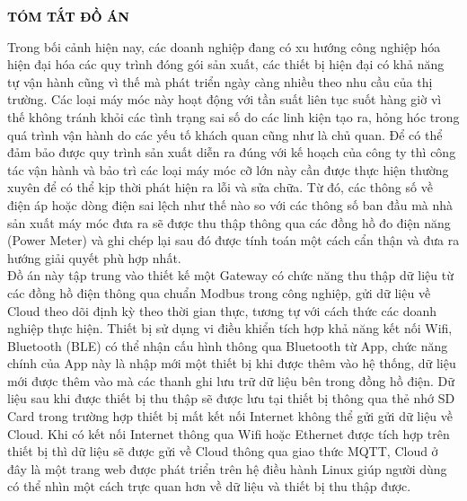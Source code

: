 \begin{center}
	{\fontsize{24pt}{24pt}\selectfont\textbf{\textcolor{black}{TÓM TẮT ĐỒ ÁN}}}
\end{center}

Trong bối cảnh hiện nay, các doanh nghiệp đang có xu hướng công nghiệp hóa hiện 
đại hóa các quy trình đóng gói sản xuất, các thiết bị hiện đại có khả năng tự vận hành cũng 
vì thế mà phát triển ngày càng nhiều theo nhu cầu của thị trường. Các loại máy móc này hoạt 
động với tần suất liên tục suốt hàng giờ vì thế không tránh khỏi các tình trạng sai số do các linh 
kiện tạo ra, hỏng hóc trong quá trình vận hành do các yếu tố khách quan cũng như là chủ 
quan. Để có thể đảm bảo được quy trình sản xuất diễn ra đúng với kế hoạch của công ty thì 
công tác vận hành và bảo trì các loại máy móc cỡ lớn này cần được thực hiện thường xuyên 
để có thể kịp thời phát hiện ra lỗi và sửa chữa. Từ đó, các thông số về điện áp hoặc dòng điện sai 
lệch như thế nào so với các thông số ban đầu mà nhà sản xuất máy móc đưa ra sẽ được thu thập thông 
qua các đồng hồ đo điện năng (Power Meter) và ghi chép lại sau đó được tính toán một cách cẩn thận và 
đưa ra hướng giải quyết phù hợp nhất. \\

Đồ án này tập trung vào thiết kế một Gateway có chức năng thu thập dữ liệu từ các đồng hồ điện thông 
qua chuẩn Modbus trong công nghiệp, gửi dữ liệu về Cloud theo dõi định kỳ theo thời gian thực, tương 
tự với cách thức các doanh nghiệp thực hiện. Thiết bị sử dụng vi điều khiển tích hợp khả năng kết nối 
Wifi, Bluetooth (BLE) có thể nhận cấu hình thông qua Bluetooth từ App, chức năng chính của App này là 
nhập mới một thiết bị khi được thêm vào hệ thống, dữ liệu mới được thêm vào mà các thanh ghi lưu trữ 
dữ liệu bên trong đồng hồ điện. Dữ liệu sau khi được thiết bị thu thập sẽ được lưu tại thiết bị thông
qua thẻ nhớ SD Card trong trường hợp thiết bị mất kết nối Internet không thể gửi gửi dữ liệu về Cloud.
Khi có kết nối Internet thông qua Wifi hoặc Ethernet được tích hợp trên thiết bị thì dữ liệu sẽ được gửi
về Cloud thông qua giao thức MQTT, Cloud ở đây là một trang web được phát triển trên hệ điều hành Linux
giúp người dùng có thể nhìn một cách trực quan hơn về dữ liệu và thiết bị thu thập được.\\

